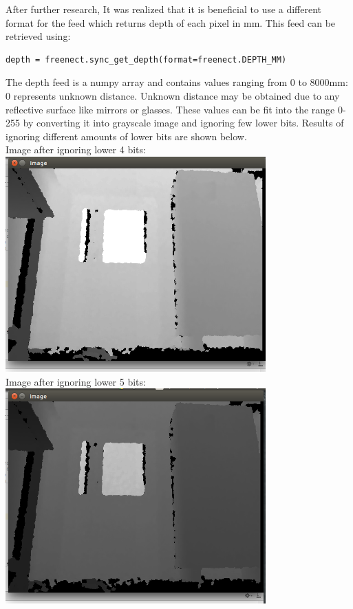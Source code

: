 \documentclass{report}
\begin{document}
After further research, It was realized that it is beneficial to use a different format for the feed which returns depth of each pixel 
in mm. This feed can be retrieved using: \\
\begin{lstlisting}
depth = freenect.sync_get_depth(format=freenect.DEPTH_MM)
\end{lstlisting}

The depth feed is a numpy array and contains values ranging from 0 to 8000mm: 0 represents unknown distance. Unknown distance may be 
obtained due to any reflective surface like mirrors or glasses. These values can be fit into the range 0-255 by converting it 
into grayscale image and ignoring few lower bits. Results of ignoring different amounts of lower bits are shown below. \pagebreak
\\
Image after ignoring lower 4 bits: \\
\includegraphics[width = 10cm]{d_4bit.png} \\
Image after ignoring lower 5 bits: \\
\includegraphics[width = 10cm]{d_5bit.png} \\
\pagebreak
\end{document}
